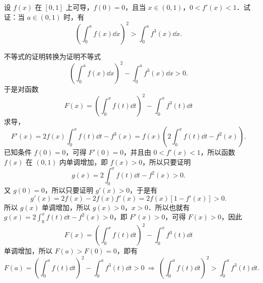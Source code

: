 设 $f(x)$ 在 $[0,1]$ 上可导，$f(0)=0$，且当 $x\in(0,1)$，$0<f'(x)<1$．试证：当 $a\in(0,1)$ 时，有
\[
  \left(\int_0^a f(x)\dd x\right)^2>\int_0^a f^3(x)\dd x.
\]
\begin{solution}
  不等式的证明转换为证明不等式
  \[
    \left(\int_0^a f(x)\dd x\right)^2-\int_0^a f^3(x)\dd x>0.
  \]
  于是对函数
  \[
    F(x)=\left(\int_0^x f(t)\dd t\right)^2-\int_0^x f^3(t)\dd t
  \]
  求导，
  \[
    F'(x)=2f(x)\int_0^x f(t)\dd t-f^3(x)=f(x)\left(2\int_0^x f(t)\dd t-f^2(x)\right).
  \]
  已知条件 $f(0)=0$，可得 $F'(0)=0$，并且由 $0<f'(x)<1$，所以函数 $f(x)$ 在 $(0,1)$ 内单调增加，即 $f(x)>0$，所以只要证明
  \[
    g(x)=2\int_0^x f(t)\dd t-f^2(x)>0.
  \]
  又 $g(0)=0$，所以只要证明 $g'(x)>0$，于是有
  \[
    g'(x)=2f(x)-2f(x)f'(x)=2f(x)\left[1-f'(x)\right]>0.
  \]
  所以 $g(x)$ 单调增加，所以 $g(x)>0$，$x>0$．所以也就有 $g(x)=2\int_0^x f(t)\dd t-f^2(x)>0$，即 $F'(x)>0$，可得 $F(x)>0$，因此
  \[
    F(x)=\left(\int_0^x f(t)\dd t\right)^2-\int_0^x f^3(t)\dd t
  \]
  单调增加，所以 $F(a)>F(0)=0$，即有
  \[
    F(a)=\left(\int_0^a f(t)\dd t\right)^2-\int_0^a f^3(t)\dd t>0
    \ \Rightarrow\ \left(\int_0^a f(t)\dd t\right)^2>\int_0^a f^3(t)\dd t.
  \]
\end{solution}

